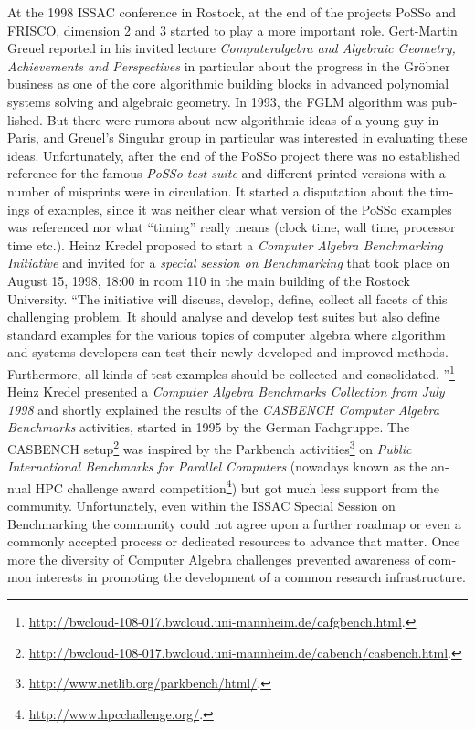 \documentclass[11pt]{article}
\begin{document}
\begin{otherlanguage}{english}
\begin{multicols}{2}
At the 1998 ISSAC conference in Rostock, at the end of the projects PoSSo and
FRISCO, dimension 2 and 3 started to play a more important role.  Gert-Martin
Greuel reported in his invited lecture \emph{Computeralgebra and Algebraic
  Geometry, Achievements and Perspectives} in particular about the progress in
the Gr\"obner business as one of the core algorithmic building blocks in
advanced polynomial systems solving and algebraic geometry.  In 1993, the FGLM
algorithm was published. But there were rumors about new algorithmic ideas of a
young guy in Paris, and Greuel's Singular group in particular was interested in
evaluating these ideas.  Unfortunately, after the end of the PoSSo project
there was no established reference for the famous \emph{PoSSo test suite} and
different printed versions with a number of misprints were in circulation.  It
started a disputation about the timings of examples, since it was neither clear
what version of the PoSSo examples was referenced nor what ``timing'' really
means (clock time, wall time, processor time etc.).  Heinz Kredel proposed to
start a \emph{Computer Algebra Benchmarking Initiative} and invited for a
\emph{special session on Benchmarking} that took place on August 15, 1998,
18:00 in room 110 in the main building of the Rostock University.  ``The
initiative will discuss, develop, define, collect all facets of this
challenging problem. It should analyse and develop test suites but also define
standard examples for the various topics of computer algebra where algorithm
and systems developers can test their newly developed and improved
methods. Furthermore, all kinds of test examples should be collected and
consolidated. ''\footnote{\url{http://bwcloud-108-017.bwcloud.uni-mannheim.de/cafgbench.html}.}
Heinz Kredel presented a \emph{Computer Algebra Benchmarks Collection from July
  1998} and shortly explained the results of the \emph{CASBENCH Computer
  Algebra Benchmarks} activities, started in 1995 by the German Fachgruppe.
The CASBENCH
setup\footnote{\url{http://bwcloud-108-017.bwcloud.uni-mannheim.de/cabench/casbench.html}.}
was inspired by the Parkbench
activities\footnote{\url{http://www.netlib.org/parkbench/html/}.} on
\emph{Public International Benchmarks for Parallel Computers} (nowadays known
as the annual HPC challenge award
competition\footnote{\url{http://www.hpcchallenge.org/}.}) but got much less
support from the community. Unfortunately, even within the ISSAC Special
Session on Benchmarking the community could not agree upon a further roadmap or
even a commonly accepted process or dedicated resources to advance that
matter. Once more the diversity of Computer Algebra challenges prevented
awareness of common interests in promoting the development of a common research
infrastructure.


\end{multicols}
\end{otherlanguage}
\end{document}
